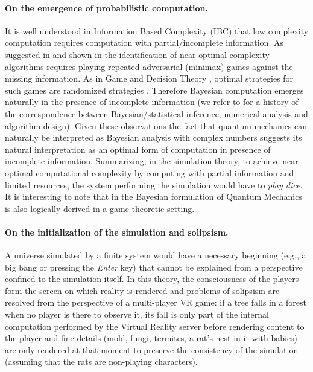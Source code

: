 \documentclass[11pt]{article}
\theoremstyle{definition}
\begin{document}
\paragraph{On the emergence of probabilistic computation.}
It is well understood in Information Based Complexity (IBC) \cite{Traub1988, Woniakowski1986, Packel1987, Nemirovsky1992, Woniakowski2009} that low complexity computation requires computation with partial/incomplete information.
As suggested in \cite{Packel1987} and shown in \cite{OwhadiMultigrid:2015} the identification of near optimal complexity algorithms
requires playing repeated adversarial (minimax) games against the missing information. As in Game  \cite{VNeumann28, VonNeumann:1944} and Decision Theory \cite{Wald:1945}, optimal strategies for such games are randomized strategies \cite{OwhadiMultigrid:2015}. Therefore Bayesian computation emerges naturally \cite{OwSccig2017, cockayne2017bayesian} in the presence of incomplete information (we refer to
 \cite{Poincare:1896, Suldin1959, Larkin1972, Diaconis:1988, Shaw:1988, Hagan:1991, Owhadi:2014, Hennig2015, OwScWald2016, OwhadiMultigrid:2015, cockayne2017bayesian, OwSccig2017} for a history of the correspondence between Bayesian/statistical inference, numerical analysis and algorithm design).
Given these observations the fact that quantum mechanics can naturally be interpreted as Bayesian analysis with complex numbers
 \cite{Caves2002-CAVQPA, Benavolietal2016} suggests its natural interpretation as an optimal form of computation in presence of incomplete information.
 Summarizing, in the simulation theory,
 to achieve near optimal computational complexity by computing with partial information and limited resources, the system performing the simulation would have to \emph{play dice}.
It is interesting to note that in \cite{Benavolietal2016} the Bayesian formulation of Quantum Mechanics is also logically derived in a game theoretic setting.








 \paragraph{On the initialization of the simulation and solipsism.}
 A universe simulated by a finite system would have a necessary beginning (e.g., a big bang or pressing the \emph{Enter} key) that cannot be explained from a perspective confined to the simulation itself.
 In this theory, the consciousness of the players form the screen on which reality is rendered and problems of
  solipsism are resolved from the perspective  of a multi-player VR game: if a tree falls in a forest when no player is there to observe it,  its fall is only part of the internal computation performed  by the Virtual Reality server before rendering content to the player
and fine details (mold, fungi, termites, a rat’s nest in it with babies) are only rendered at that moment to preserve the consistency of the simulation (assuming that the rats are non-playing characters).
\end{document}
